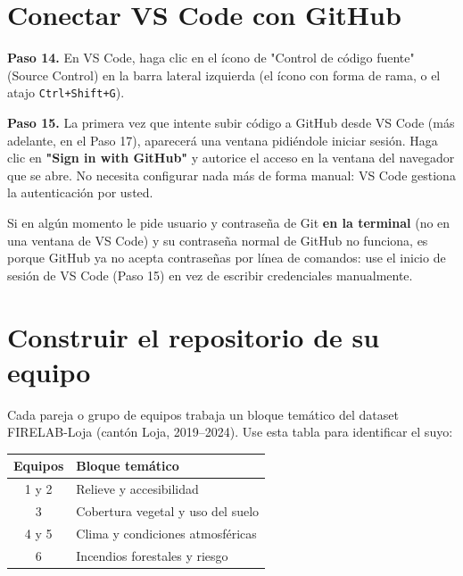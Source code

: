 \documentclass[11pt,a4paper]{article}
\newcommand{\code}[1]{\texttt{#1}}
\begin{document}
\section{Conectar VS Code con GitHub}

\begin{stepbox}
\textbf{Paso 14.} En VS Code, haga clic en el ícono de "Control de código fuente" (Source Control) en la barra lateral izquierda (el ícono con forma de rama, o el atajo \code{Ctrl+Shift+G}).
\end{stepbox}

\begin{stepbox}
\textbf{Paso 15.} La primera vez que intente subir código a GitHub desde VS Code (más adelante, en el Paso 17), aparecerá una ventana pidiéndole iniciar sesión. Haga clic en \textbf{"Sign in with GitHub"} y autorice el acceso en la ventana del navegador que se abre. No necesita configurar nada más de forma manual: VS Code gestiona la autenticación por usted.
\end{stepbox}

\begin{tip}
Si en algún momento le pide usuario y contraseña de Git \textbf{en la terminal} (no en una ventana de VS Code) y su contraseña normal de GitHub no funciona, es porque GitHub ya no acepta contraseñas por línea de comandos: use el inicio de sesión de VS Code (Paso 15) en vez de escribir credenciales manualmente.
\end{tip}

\section{Construir el repositorio de su equipo}

Cada pareja o grupo de equipos trabaja un bloque temático del dataset FIRELAB-Loja (cantón Loja, 2019--2024). Use esta tabla para identificar el suyo:

\begin{center}
\renewcommand{\arraystretch}{1.3}
\begin{tabular}{c p{9.5cm}}
\hline
\textbf{Equipos} & \textbf{Bloque temático} \\
\hline
1 y 2 & Relieve y accesibilidad \\
3 & Cobertura vegetal y uso del suelo \\
4 y 5 & Clima y condiciones atmosféricas \\
6 & Incendios forestales y riesgo \\
\hline
\end{tabular}
\end{center}
\end{document}
